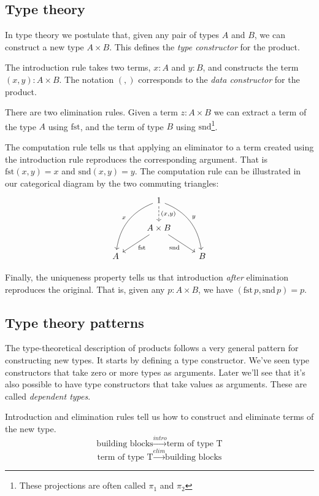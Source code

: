 \documentclass[DaoFP]{subfiles}
\begin{document}
\subsection{Type theory}
In type theory we postulate that, given any pair of types $A$ and $B$, we can construct a new type $A \times B$. This defines the \emph{type constructor} for the product.

The introduction rule takes two terms, $x \colon A$ and $y \colon B$, and constructs the term $(x, y) \colon A \times B$. The notation $(,)$ corresponds to the \emph{data constructor} for the product.

There are two elimination rules. Given a term $z \colon A \times B$ we can extract a term of the type $A$ using $\text{fst}$, and  the term of type $B$ using $\text{snd}$\footnote{These projections are often called $\pi_1$ and $\pi_2$}.

The computation rule tells us that applying an eliminator to a term created using the introduction rule reproduces the corresponding argument. That is  $\text{fst} (x, y) = x$ and  $\text{snd} (x, y) = y$.
The computation rule can be illustrated in our categorical diagram by the two commuting triangles:
\[
 \begin{tikzcd}
 & 1
\arrow[d, dashed, "{(x, y)}"]
 \arrow[ddl, bend right, "x"']
 \arrow[ddr, bend left, "y"]
\\
&A \times B
 \arrow[dl,  "\text{fst}"]
 \arrow[dr,   "\text{snd}"']
\\
A && B
 \end{tikzcd}
\]

Finally, the uniqueness property tells us that introduction \emph{after} elimination reproduces the original. That is, given any $p \colon A \times B$, we have $(\text{fst}\,p, \text{snd}\, p ) = p$.

\subsection{Type theory patterns}

The type-theoretical description of products follows a very general pattern for constructing new types. It starts by defining a type constructor. We've seen type constructors that take zero or more types as arguments. Later we'll see that it's also possible to have type constructors that take values as arguments. These are called \emph{dependent types}.

Introduction and elimination rules tell us how to construct and eliminate terms of the new type. 
\[ \text{building blocks} \xrightarrow{intro} \text{term of type T} \]
\[ \text{term of type T} \xrightarrow{elim} \text{building blocks} \]
\end{document}
